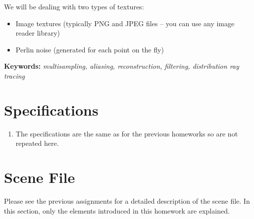 \documentclass[12pt]{article}
\begin{document}
We will be dealing with two types of textures:

\begin{itemize}
\item Image textures (typically PNG and JPEG files -- you can use any image reader library)
\item Perlin noise (generated for each point on the fly)
\end{itemize}

\vspace{0.5cm} \noindent \textbf{Keywords:} \emph{multisampling,
    aliasing, reconstruction, filtering, distribution ray tracing}

\section{Specifications}
\begin{enumerate}


\item \textbf{}The specifications are the same as for the previous
homeworks so are not repeated here. 

\end{enumerate}

\section{Scene File}
\label{sec:sceneFile}

\noindent Please see the previous assignments for a detailed
description of the scene file.  In this section, only the elements
introduced in this homework are explained.
\end{document}
